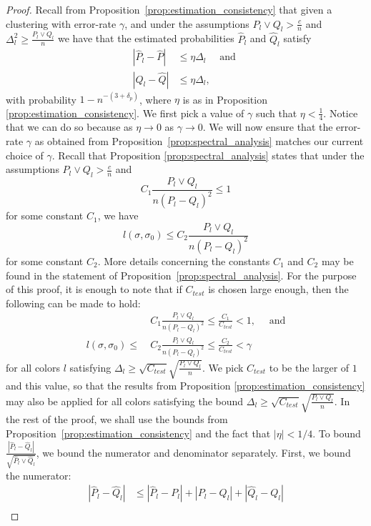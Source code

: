 \documentclass{article}
\begin{document}
\begin{proof}
Recall from Proposition~\ref{prop:estimation_consistency} that given a clustering with error-rate $\gamma$, and under the assumptions  $P_l \vee Q_l > \frac{c}{n}$ and $\Delta_l^2 \geq \frac{P_l \vee Q_l}{n}$ we have that the estimated probabilities $\hat P_l$ and $\hat Q_l$ satisfy 
\begin{align*}
|\hat P_l - \hat P| &\leq \eta \Delta_l \quad \text{ and }\\
|\hat Q_l - \hat Q| &\leq \eta \Delta_l,
\end{align*}
with probability $1-n^{-(3+\delta_p)}$, where $\eta$ is as in Proposition \ref{prop:estimation_consistency}. We first pick a value of $\gamma$ such that $\eta < \frac{1}{4}$. Notice that we can do so because as $\eta \to 0$ as $\gamma \to 0$. We will now ensure that the error-rate $\gamma$ as obtained from Proposition~\ref{prop:spectral_analysis} matches our current choice of $\gamma$. Recall that Proposition \ref{prop:spectral_analysis} states that under the assumptions $P_l \vee Q_l > \frac{c}{n}$ and 
$$ C_1 \frac{P_l \vee Q_l}{n(P_l - Q_l)^2} \leq 1$$
for some constant $C_1$, we have 
$$l(\sigma, \sigma_0) \leq C_2 \frac{P_l \vee Q_l}{n(P_l - Q_l)^2}$$
for some constant $C_2$. More details concerning the constants $C_1$ and $C_2$ may be found in the statement of Proposition~\ref{prop:spectral_analysis}. For the purpose of this proof, it is enough to note that if $C_{test}$ is chosen large enough, then the following can be made to hold:
\begin{align*}
&C_1 \frac{P_l \vee Q_l}{n(P_l - Q_l)^2} \leq \frac{C_1}{C_{test}} < 1, \quad \text{ and}\\
l(\sigma, \sigma_0) \leq ~&C_2 \frac{P_l \vee Q_l}{n(P_l - Q_l)^2} \leq \frac{C_2}{C_{test}} < \gamma
\end{align*}
for all colors $l$ satisfying $\Delta_l \geq \sqrt{C_{test}} \sqrt{\frac{P_l \vee Q_l}{n}}$. We pick $C_{test}$ to be the larger of $1$ and this value, so that the results from Proposition \ref{prop:estimation_consistency} may also be applied for all colors satisfying the bound $\Delta_l \geq \sqrt{C_{test}} \sqrt{\frac{P_l \vee Q_l}{n}}$. In the rest of the proof, we shall use the bounds from Proposition~\ref{prop:estimation_consistency} and the fact that $|\eta| < 1/4.$ To bound $\frac{ | \hat{P}_l - \hat{Q}_l | }{\sqrt{ \hat{P}_l \vee \hat{Q}_l}}$, we bound the numerator and denominator separately. First, we bound the numerator:
\begin{align*}
| \hat{P}_l - \hat{Q}_l | &\leq |\hat{P}_l - P_l| + |P_l - Q_l| + |\hat{Q}_l - Q_l|   \\

\end{align*}
\end{proof}
\end{document}
